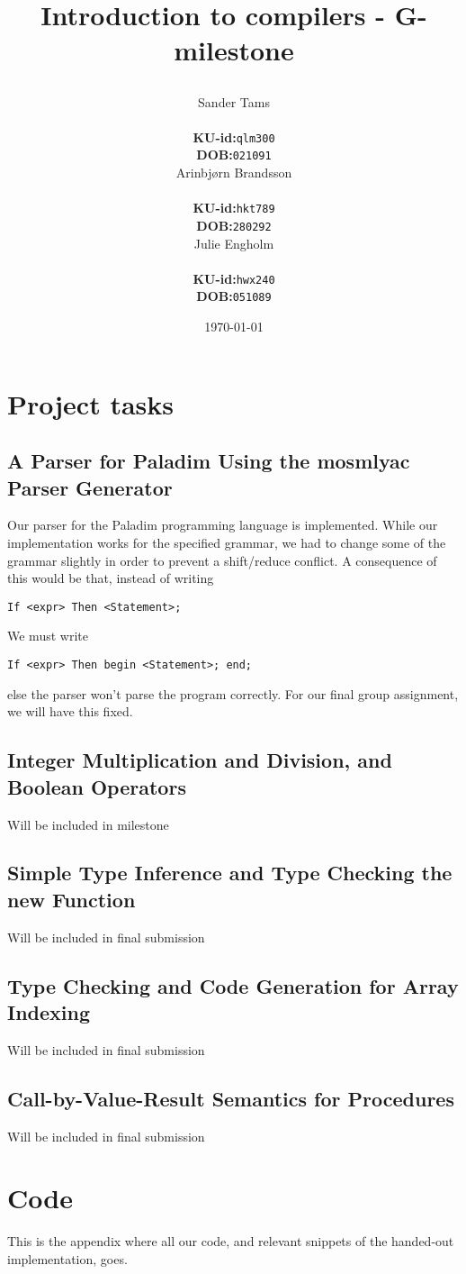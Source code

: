 \documentclass[11pt,a4paper,oneside,final]{article}
\title{%
    \vspace{2in}
    \begin{minipage}{\textwidth}
        \centering
        Introduction to compilers - G-milestone \\
    \end{minipage}
    \author{%
     \begin{minipage}{0.30\textwidth}
            \centering
            Sander Tams\\
            \begin{tabular}{l l}
                {\bf KU-id:}& {\tt qlm300}\\
                {\bf DOB:}  & {\tt 021091}
            \end{tabular}
        \end{minipage}
        \begin{minipage}{0.30\textwidth}
            \centering
            Arinbjørn Brandsson\\
            \begin{tabular}{l l}
                {\bf KU-id:}& {\tt hkt789}\\
                {\bf DOB:}  & {\tt 280292}
            \end{tabular}
        \end{minipage}
        \begin{minipage}{0.30\textwidth}
            \centering
            Julie Engholm\\
            \begin{tabular}{l l}
                {\bf KU-id:}& {\tt hwx240}\\
                {\bf DOB:}  & {\tt 051089}
            \end{tabular}
        \end{minipage}
    }
    \setcounter{page}{0}
    \date{\today}
}
\begin{document}
\maketitle
\thispagestyle{empty}
\newpage

\thispagestyle{psty:toc}
\tableofcontents
\setcounter{page}{0}
\newpage
\section{Project tasks}
\subsection{A Parser for Paladim Using the mosmlyac Parser Generator}

Our parser for the Paladim programming language is implemented. 
While our implementation works for the specified grammar, 
we had to change some of the grammar slightly in order to 
prevent a shift/reduce conflict. A consequence of this would be that, 
instead of writing
\begin{lstlisting}
If <expr> Then <Statement>;
\end{lstlisting} 
We must write 
\begin{lstlisting}
If <expr> Then begin <Statement>; end;
\end{lstlisting}
else the parser won't parse the program correctly. For our final 
group assignment, we will have this fixed.
\subsection{Integer Multiplication and Division, and Boolean Operators}

Will be included in milestone

\subsection{Simple Type Inference and Type Checking the new Function}

Will be included in final submission

\subsection{Type Checking and Code Generation for Array Indexing}

Will be included in final submission

\subsection{Call-by-Value-Result Semantics for Procedures}

Will be included in final submission

\appendix
\section{Code}
This is the appendix where all our code, and relevant snippets of the handed-out implementation, goes.
\end{document}

